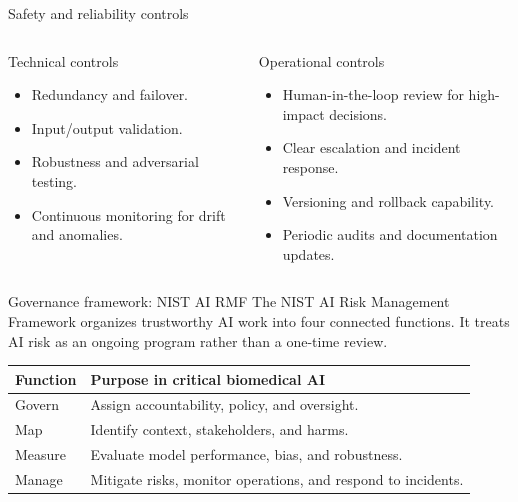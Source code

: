 \documentclass[aspectratio=169]{beamer}
\begin{document}
\begin{frame}{Safety and reliability controls}
\begin{columns}[T,onlytextwidth]
  \begin{block}{Technical controls}
    \begin{itemize}
      \item Redundancy and failover.
      \item Input/output validation.
      \item Robustness and adversarial testing.
      \item Continuous monitoring for drift and anomalies.
    \end{itemize}
  \end{block}
  \begin{block}{Operational controls}
    \begin{itemize}
      \item Human-in-the-loop review for high-impact decisions.
      \item Clear escalation and incident response.
      \item Versioning and rollback capability.
      \item Periodic audits and documentation updates.
    \end{itemize}
  \end{block}
\end{columns}
\end{frame}

\begin{frame}{Governance framework: NIST AI RMF}
The NIST AI Risk Management Framework organizes trustworthy AI work into four connected functions. It treats AI risk as an ongoing program rather than a one-time review.
\begin{table}
  \centering
  \begin{tabular}{p{2.4cm}p{7.2cm}}
    \toprule
    \textbf{Function} & \textbf{Purpose in critical biomedical AI} \\
    \midrule
    Govern  & Assign accountability, policy, and oversight. \\
    Map     & Identify context, stakeholders, and harms. \\
    Measure & Evaluate model performance, bias, and robustness. \\
    Manage  & Mitigate risks, monitor operations, and respond to incidents. \\
    \bottomrule
  \end{tabular}
\end{table}
\end{frame}
\end{document}
